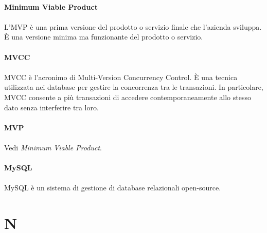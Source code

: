 \documentclass[10pt, a4paper]{article}
\begin{document}
\vspace{2em}
\paragraph{Minimum Viable Product}\noindent\hrulefill
\paragraph{}L’MVP è una prima versione del prodotto o servizio finale che l’azienda sviluppa. È una versione minima ma funzionante del prodotto o servizio.

\vspace{2em}
\paragraph{MVCC}\noindent\hrulefill 
\paragraph{}MVCC è l'acronimo di Multi-Version Concurrency Control. È una tecnica utilizzata nei database per gestire la concorrenza tra le transazioni. In particolare, MVCC consente a più transazioni di accedere contemporaneamente allo stesso dato senza interferire tra loro.

\vspace{2em}
\paragraph{MVP}\noindent\hrulefill 
\paragraph{}Vedi \textit{Minimum Viable Product\pg}.

\vspace{2em}
\paragraph{MySQL}\noindent\hrulefill 
\paragraph{}MySQL è un sistema di gestione di database relazionali open-source.

\newpage
\section{N}
\end{document}
